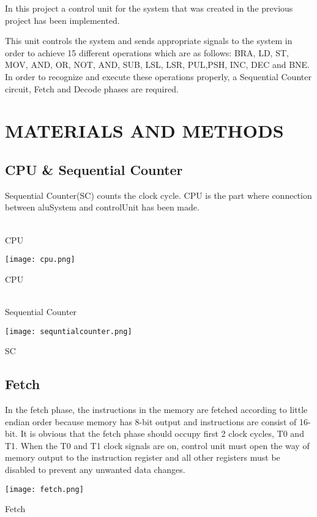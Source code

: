 \documentclass[pdftex,12pt,a4paper]{article}
\begin{document}
In this project a control unit for the system that was created in the previous project has been implemented.

This unit controls the system and sends appropriate signals to the system in order to achieve 15 different operations which are as follows: BRA, LD, ST, MOV, AND, OR, NOT, AND, SUB, LSL, LSR, PUL,PSH, INC, DEC and BNE. In order to recognize and execute these operations properly, a Sequential Counter circuit, Fetch and Decode phases are required.

\section{MATERIALS AND METHODS}

\subsection{CPU & Sequential Counter}
Sequential Counter(SC) counts the clock cycle. CPU is the part where connection between aluSystem and controlUnit has been made.

\\
CPU\\
\begin{figure32}
	\centering
	\texttt{[image: cpu.png]}	
	\caption{CPU}
	\label{fig1}
\end{figure32}

\\
Sequential Counter\\
\begin{figure0}
	\centering
	\texttt{[image: sequntialcounter.png]}	
	\caption{SC}
	\label{fig0}
\end{figure0}


\subsection{Fetch}
In the fetch phase, the instructions in the memory are fetched according to little endian order because memory has 8-bit output and instructions are consist of 16-bit. It is obvious that the fetch phase should occupy first 2 clock cycles, T0 and T1. When the T0 and T1
clock signals are on, control unit must open the way of memory output to the instruction register and all other registers must be disabled to prevent any unwanted data changes.

\begin{figure1}
	\centering
	\texttt{[image: fetch.png]}	
	\caption{Fetch}
	\label{fig1}
\end{figure1}
\end{document}

